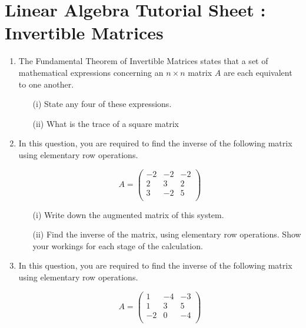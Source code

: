 \documentclass[a4paper,12pt]{article}
\begin{document}
\section*{Linear Algebra Tutorial Sheet : Invertible Matrices}
\begin{enumerate}
\item The Fundamental Theorem of Invertible Matrices states that a set of mathematical expressions concerning an $n\times n$ matrix $A$ are each equivalent to one another.

\begin{itemize}
\item[(i)] 
State any four of these expressions.
\item[(ii)]  What is the trace of a square matrix
\end{itemize}

\medskip
\item 
In this question, you are required to find the inverse of the following matrix using elementary row operations.

\begin{equation*}
A=\left( \begin{array}{rrr}
-2  &  -2  &  -2\\
2  &  3  &  2\\
3  & -2  &  5\\
\end{array} \right)
\end{equation*}


\begin{itemize}
\item[(i)]  Write down the augmented matrix of this system. %


\item[(ii)] Find the inverse of the matrix, using elementary row operations. Show your workings for each stage of the calculation.
\end{itemize}
\item 
In this question, you are required to find the inverse of the following matrix using elementary row operations.

\begin{equation*}
A=\left( \begin{array}{rrr}
  1 &  -4   & -3 \\
  1 &   3   & 5 \\
  -2 &   0   & -4 \\
\end{array} \right)
\end{equation*}



\end{enumerate}
\end{document}

